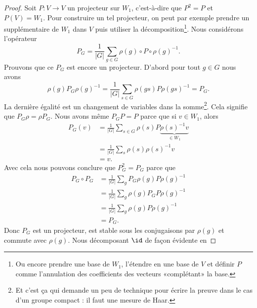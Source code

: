\begin{proof}
    Soit \( P\colon V\to V\) un projecteur sur \( W_1\), c'est-à-dire que \( P^2=P\) et \( P(V)=W_1\). Pour construire un tel projecteur, on peut par exemple prendre un supplémentaire de \( W_1\) dans \( V\) puis utiliser la décomposition\footnote{Ou encore prendre une base de \( W_1\), l'étendre en une base de \( V\) et définir \( P\) comme l'annulation des coefficients des vecteurs «complétant» la base.}. Nous considérons l'opérateur
    \begin{equation}
        P_G=\frac{1}{ | G | }\sum_{g\in G}\rho(g)\circ P\circ \rho(g)^{-1}.
    \end{equation}
    Prouvons que ce \( P_G\) est encore un projecteur. D'abord pour tout \( g\in G\) nous avons
    \begin{equation}
        \rho(g)P_G\rho(g)^{-1}=\frac{1}{ | G | }\sum_{s\in G}\rho(gs)P\rho(gs)^{-1}=P_G.
    \end{equation}
    La dernière égalité est un changement de variables dans la somme\footnote{Et c'est ça qui demande un peu de technique pour écrire la preuve dans le cas d'un groupe compact : il faut une mesure de Haar.}. Cela signifie que \( P_G\rho=\rho P_G\). Nous avons même \( P_GP=P\) parce que si \( v\in W_1\), alors
    \begin{subequations}
        \begin{align}
            P_G(v)&=\frac{1}{ | G | }\sum_{s\in G}\rho(s)P\underbrace{\rho(s)^{-1} v}_{\in W_1}\\
            &=\frac{1}{ | G | }\sum_s\rho(s)\rho(s)^{-1} v\\
            &=v.
        \end{align}
    \end{subequations}
    Avec cela nous pouvons conclure que \( P_G^2=P_G\) parce que
    \begin{subequations}
        \begin{align}
            P_G\circ P_G&=\frac{1}{ | G | }\sum_g P_G\rho(g)P\rho(g)^{-1}\\
            &=\frac{1}{ | G | }\sum_g \rho(g)P_GP\rho(g)^{-1}\\
            &=\frac{1}{ | G | }\sum_g \rho(g)P\rho(g)^{-1}\\
            &=P_G.
        \end{align}
    \end{subequations}
    Donc \( P_G\) est un projecteur, est stable sous les conjugaisons par \( \rho(g)\) et commute avec \( \rho(g)\). Nous décomposant \( \id\) de façon évidente en

\end{proof}
